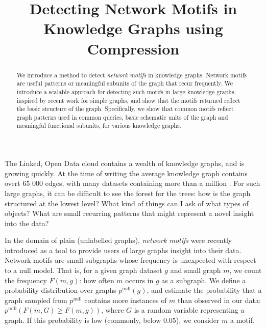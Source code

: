 \documentclass[11pt]{article}
\title{Detecting Network Motifs in Knowledge Graphs using Compression}
\begin{document}
\maketitle

\begin{abstract}
We introduce a method to detect \emph{network motifs} in knowledge graphs. Network motifs are useful patterns or meaningful subunits of the graph that recur frequently. We introduce a scalable approach for detecting such motifs in large knowledge graphs, inspired by recent work for simple graphs, and show that the motifs returned reflect the basic structure of the graph. Specifically, we show that common motifs reflect graph patterns used in common queries, basic schematic units of the graph and meaningful functional subunits, for various knowledge graphs.
\end{abstract}

The Linked, Open Data cloud contains a wealth of knowledge graphs, and is growing quickly. At the time of writing the average knowledge graph contains overt 65 000 edges, with many datasets containing more than a million \footnotemark. For such large graphs, it can be difficult to see the forest for the trees: how is the graph structured at the lowest level? What kind of things can I ask of what types of objects? What are small recurring patterns that might represent a novel insight into the data?


In the domain of plain (unlabelled graphs), \emph{network motifs} were recently introduced as a tool to provide users of large graphs insight into their data. Network motifs are small subgraphs whose frequency is unexpected with respect to a null model. That is, for a given graph dataset $g$ and small graph $m$, we count the frequency $F(m, g)$: how often $m$ occurs in $g$ as a subgraph. We define a probability distribution over graphs $p^\text{null}(g)$, and estimate the probability that a graph sampled from $p^\text{null}$ contains more instances of $m$ than observed in our data: $p^\text{null}(F(m, G) \geq F(m, g))$, where $G$ is a random variable representing a graph. If this probability is low (commonly, below 0.05), we consider $m$ a motif. \footnotemark

\end{document}

